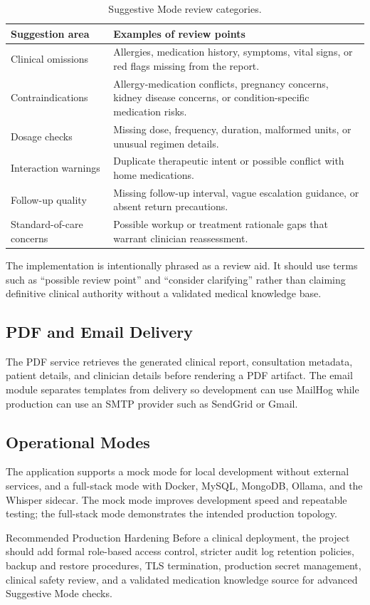 \begin{table}[h]
\centering
\begin{tabularx}{\textwidth}{@{}L{0.22\textwidth}Y@{}}
\toprule
\textbf{Suggestion area} & \textbf{Examples of review points} \\
\midrule
Clinical omissions & Allergies, medication history, symptoms, vital signs, or red flags missing from the report. \\
Contraindications & Allergy-medication conflicts, pregnancy concerns, kidney disease concerns, or condition-specific medication risks. \\
Dosage checks & Missing dose, frequency, duration, malformed units, or unusual regimen details. \\
Interaction warnings & Duplicate therapeutic intent or possible conflict with home medications. \\
Follow-up quality & Missing follow-up interval, vague escalation guidance, or absent return precautions. \\
Standard-of-care concerns & Possible workup or treatment rationale gaps that warrant clinician reassessment. \\
\bottomrule
\end{tabularx}
\caption{Suggestive Mode review categories.}
\end{table}

The implementation is intentionally phrased as a review aid. It should use terms such as ``possible review point'' and ``consider clarifying'' rather than claiming definitive clinical authority without a validated medical knowledge base.

\subsection{PDF and Email Delivery}

The PDF service retrieves the generated clinical report, consultation metadata, patient details, and clinician details before rendering a PDF artifact. The email module separates templates from delivery so development can use MailHog while production can use an SMTP provider such as SendGrid or Gmail.

\subsection{Operational Modes}

The application supports a mock mode for local development without external services, and a full-stack mode with Docker, MySQL, MongoDB, Ollama, and the Whisper sidecar. The mock mode improves development speed and repeatable testing; the full-stack mode demonstrates the intended production topology.

\begin{calloutbox}{Recommended Production Hardening}
Before a clinical deployment, the project should add formal role-based access control, stricter audit log retention policies, backup and restore procedures, TLS termination, production secret management, clinical safety review, and a validated medication knowledge source for advanced Suggestive Mode checks.
\end{calloutbox}